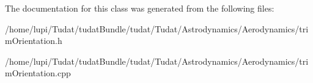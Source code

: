 The documentation for this class was generated from the following files\+:\begin{DoxyCompactItemize}
\item 
/home/lupi/\+Tudat/tudat\+Bundle/tudat/\+Tudat/\+Astrodynamics/\+Aerodynamics/trim\+Orientation.\+h\item 
/home/lupi/\+Tudat/tudat\+Bundle/tudat/\+Tudat/\+Astrodynamics/\+Aerodynamics/trim\+Orientation.\+cpp\end{DoxyCompactItemize}
